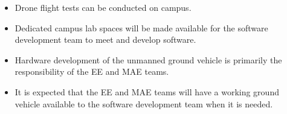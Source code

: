 
\begin{itemize}
  \item Drone flight tests can be conducted on campus.
  \item Dedicated campus lab spaces will be made available for the software development team to meet and develop software.
  \item Hardware development of the unmanned ground vehicle is primarily the responsibility of the EE and MAE teams.
  \item It is expected that the EE and MAE teams will have a working ground vehicle available to the software development team when it is needed.
\end{itemize}
